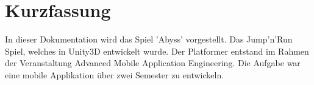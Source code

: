 \section*{Kurzfassung}
In dieser Dokumentation wird das Spiel 'Abyss' vorgestellt. Das Jump'n'Run Spiel, 
welches in Unity3D entwickelt wurde. Der Platformer entstand im Rahmen der 
Veranstaltung Advanced Mobile Application Engineering. Die Aufgabe war eine mobile 
Applikation über zwei Semester zu entwickeln. 